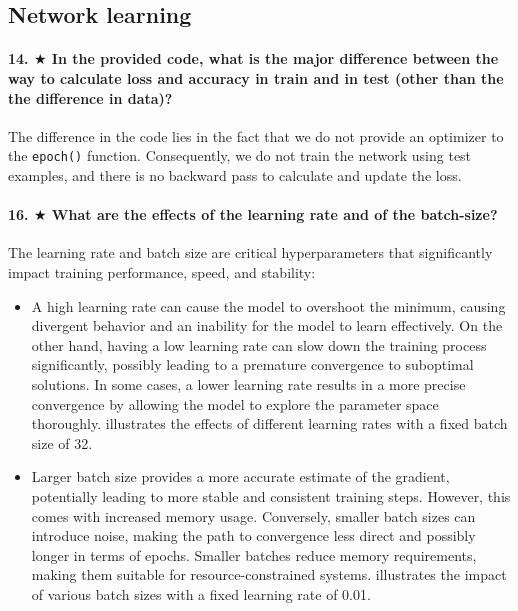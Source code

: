 \subsection{Network learning}
\paragraph{14. $ \bigstar $ In the provided code, what is the major difference between the way to calculate loss and accuracy in train and in test (other than the the difference in data)?}
The difference in the code lies in the fact that we do not provide an optimizer to the \texttt{epoch()} function. Consequently, we do not train the network using test examples, and there is no backward pass to calculate and update the loss.

\paragraph{16. $ \bigstar $ What are the effects of the learning rate and of the batch-size?}
The learning rate and batch size are critical hyperparameters that significantly impact training performance, speed, and stability:

\begin{itemize}
    \item A high learning rate can cause the model to overshoot the minimum, causing divergent behavior and an inability for the model to learn effectively. On the other hand, having a low learning rate can slow down the training process significantly, possibly leading to a premature convergence to suboptimal solutions. In some cases, a lower learning rate results in a more precise convergence by allowing the model to explore the parameter space thoroughly.  illustrates the effects of different learning rates with a fixed batch size of 32.
    \item Larger batch size provides a more accurate estimate of the gradient, potentially leading to more stable and consistent training steps. However, this comes with increased memory usage. Conversely, smaller batch sizes can introduce noise, making the path to convergence less direct and possibly longer in terms of epochs. Smaller batches reduce memory requirements, making them suitable for resource-constrained systems.  illustrates the impact of various batch sizes with a fixed learning rate of 0.01.

\end{itemize}

